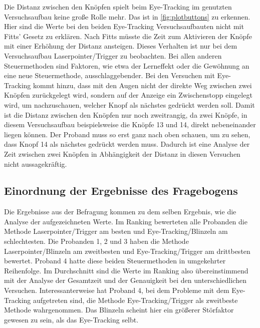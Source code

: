 Die Distanz zwischen den Knöpfen spielt beim Eye-Tracking im genutzten Versuchsaufbau keine große Rolle mehr. Das ist in \autoref{fig:plotbuttons} zu erkennen. Hier sind die Werte bei den beiden Eye-Tracking Versuchsaufbauten nicht mit Fitts' Gesetz zu erklären. Nach Fitts müsste die Zeit zum Aktivieren der Knöpfe mit einer Erhöhung der Distanz ansteigen. Dieses Verhalten ist nur bei dem Versuchsaufbau Laserpointer/Trigger zu beobachten. Bei allen anderen Steuermethoden sind Faktoren, wie etwa der Lerneffekt oder die Gewöhnung an eine neue Steuermethode, ausschlaggebender. Bei den Versuchen mit Eye-Tracking kommt hinzu, dass mit den Augen nicht der direkte Weg zwischen zwei Knöpfen zurückgelegt wird, sondern auf der Anzeige ein Zwischenstopp eingelegt wird, um nachzuschauen, welcher Knopf als nächstes gedrückt werden soll. Damit ist die Distanz zwischen den Knöpfen nur noch zweitrangig, da zwei Knöpfe, in diesem Versuchsaufbau beispielsweise die Knöpfe 13 und 14, direkt nebeneinander liegen können. Der Proband muss so erst ganz nach oben schauen, um zu sehen, dass Knopf 14 als nächstes gedrückt werden muss. Dadurch ist eine Analyse der Zeit zwischen zwei Knöpfen in Abhängigkeit der Distanz in diesen Versuchen nicht aussagekräftig.

\subsection{Einordnung der Ergebnisse des Fragebogens}
\label{section:discussionquestions}
Die Ergebnisse aus der Befragung kommen zu dem selben Ergebnis, wie die Analyse der aufgezeichneten Werte. Im Ranking bewerteten alle Probanden die Methode Laserpointer/Trigger am besten und Eye-Tracking/Blinzeln am schlechtesten. Die Probanden 1, 2 und 3 haben die Methode Laserpointer/Blinzeln am zweitbesten und Eye-Tracking/Trigger am drittbesten bewertet. Proband 4 hatte diese beiden Steuermethoden in umgekehrter Reihenfolge. Im Durchschnitt sind die Werte im Ranking also übereinstimmend mit der Analyse der Gesamtzeit und der Genauigkeit bei den unterschiedlichen Versuchen. Interessanterweise hat Proband 4, bei dem Probleme mit dem Eye-Tracking aufgetreten sind, die Methode Eye-Tracking/Trigger als zweitbeste Methode wahrgenommen. Das Blinzeln scheint hier ein größerer Störfaktor gewesen zu sein, als das Eye-Tracking selbt. 

